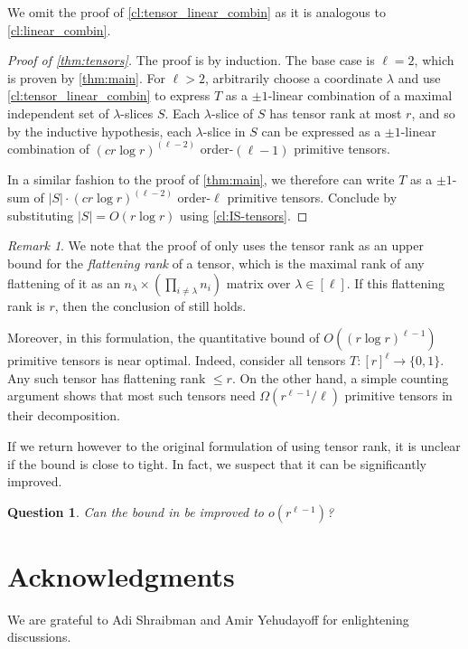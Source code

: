 \documentclass[11pt]{article}
\theoremstyle{plain}
\newtheorem{question}[thm]{Question}
\theoremstyle{remark}
\newtheorem{remark}[thm]{Remark}
\begin{document}
We omit the proof of \cref{cl:tensor_linear_combin} as it is analogous to
\cref{cl:linear_combin}.

\begin{proof}[Proof of \cref{thm:tensors}]
	The proof is by induction. The base case is $\ell=2$, which is proven by \cref{thm:main}. For $\ell>2$, arbitrarily choose a coordinate  $\lambda$ and use \cref{cl:tensor_linear_combin} to express $T$ as a $\pm 1$-linear combination of a maximal independent set of $\lambda$-slices $S$. Each $\lambda$-slice of $S$ has tensor rank at most $r$, and so by the inductive hypothesis, each $\lambda$-slice in $S$ can be expressed as a $\pm 1$-linear combination of $(cr \log r)^{(\ell - 2)}$ order-$(\ell-1)$ primitive tensors.
	
	In a similar fashion to the proof of \cref{thm:main}, we therefore can write $T$ as a $\pm 1$-sum of ${|S| \cdot (cr \log r)^{(\ell - 2)}}$ order-$\ell$ primitive tensors. Conclude by substituting $|S| = O(r \log r)$ using \cref{cl:IS-tensors}.
\end{proof}

\begin{remark}
	We note that the proof of  only uses the tensor rank as an upper bound for the \emph{flattening rank} of a tensor, which is the maximal rank of any flattening of it as an $n_\lambda \times \left( \prod_{i \ne \lambda} n_i \right)$ matrix over $\lambda \in [\ell]$. If this flattening rank is $r$, then the conclusion of  still holds. 
	
	Moreover, in this formulation, the quantitative bound of $O((r \log r)^{\ell-1})$ primitive tensors is near optimal. Indeed, consider all tensors $T:[r]^{\ell} \to \{0,1\}$. Any such tensor has flattening rank $\le r$. On the other hand, a simple counting argument shows that most such tensors need $\Omega(r^{\ell-1}/\ell)$ primitive tensors in their decomposition.
	
	If we return however to the original formulation of  using tensor rank, it is unclear if the bound is close to tight. In fact, we suspect that it can be significantly improved.
\end{remark}

\begin{question}
	Can the bound in  be improved to $o(r^{\ell-1})$?
\end{question}

\section*{Acknowledgments} 
We are grateful to Adi Shraibman and Amir Yehudayoff for enlightening discussions.


\end{document}

